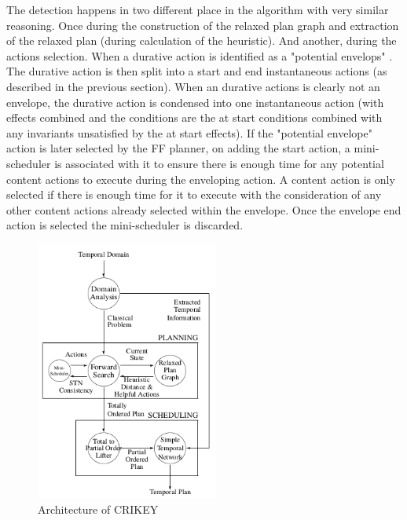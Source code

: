 \documentclass
[a4paper
,english
,parskip=half
,bibliography=totoc
]{scrreprt}
\begin{document}
    The detection happens in two different place in the algorithm with very similar reasoning. Once during the construction of the relaxed plan graph and extraction of the relaxed plan (during calculation of the heuristic). And another, during the actions selection. When a durative action is identified as a "potential envelops" . The durative action is then split into a start and end instantaneous actions (as described in the previous section). When an durative actions is clearly not an envelope, the durative action is condensed into one instantaneous action (with effects combined and the conditions are the at start conditions combined with any invariants unsatisfied by the at start effects). If the "potential envelope" action is later selected by the FF planner, on adding the start action, a mini-scheduler is associated with it to ensure there is enough time for any potential content actions to execute during the enveloping action. A content action is only selected if there is enough time for it to execute with the consideration of any other content actions already selected within the envelope. Once the envelope end action is selected the mini-scheduler is discarded.


    \begin{figure}[h]
        \centering    
        \includegraphics[width=6cm]{architecture_crikey.png}
        \caption{Architecture of CRIKEY}
         \label{fig:arch_crikey}
    \end{figure}
\end{document}
